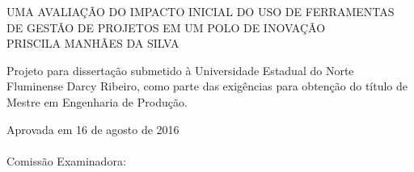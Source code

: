 \begin{folhadeaprovacao}
    \setlength{\ABNTsignthickness}{0.4pt}
    \setlength{\ABNTsignwidth}{15cm}
    \setlength{\ABNTsignskip}{0.9cm}
    \begin{center}
       {\large UMA AVALIAÇÃO DO IMPACTO INICIAL DO USO DE FERRAMENTAS DE GESTÃO DE PROJETOS EM UM POLO DE INOVAÇÃO} \\ [3.5cm]
       {\large PRISCILA MANHÃES DA SILVA} \\ [1.5cm]
        \hspace{.45\textwidth} %
        \begin{minipage}{0.5\textwidth}
        \begin{espacosimples}
        Projeto para dissertação submetido à Universidade Estadual do Norte Fluminense Darcy Ribeiro, como parte das exigências para obtenção do título de Mestre em Engenharia de Produção.
        \end{espacosimples}
        \end{minipage}
    \end{center}
    {\normalsize Aprovada em 16 de agosto de 2016} \\\\
    {\normalsize Comissão Examinadora: }
    \bigbreak
    \bigbreak
    \bigbreak
\end{folhadeaprovacao}
